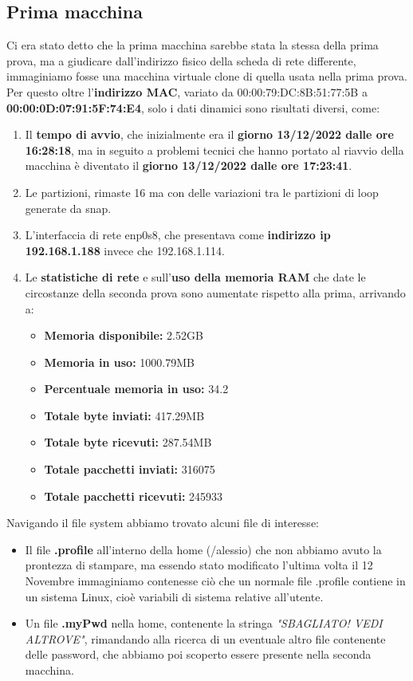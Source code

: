 \documentclass[a4paper]{report}
\begin{document}
\subsection{Prima macchina}
Ci era stato detto che la prima macchina sarebbe stata la stessa della prima prova, ma a giudicare dall'indirizzo fisico della scheda di rete differente, immaginiamo fosse una macchina virtuale clone di quella usata nella prima prova.
\\Per questo oltre l'\textbf{indirizzo MAC}, variato da 00:00:79:DC:8B:51:77:5B a\\ \textbf{00:00:0D:07:91:5F:74:E4}, solo i dati dinamici sono risultati diversi, come:
\begin{enumerate}
	\item Il \textbf{tempo di avvio}, che inizialmente era il \textbf{giorno 13/12/2022 dalle ore 16:28:18}, ma in seguito a problemi tecnici che hanno portato al riavvio della macchina è diventato il \textbf{giorno 13/12/2022 dalle ore 17:23:41}.
	\item Le partizioni, rimaste 16 ma con delle variazioni tra le partizioni di loop generate da snap.
	\item L'interfaccia di rete enp0s8, che presentava come \textbf{indirizzo ip 192.168.1.188} invece che 192.168.1.114.
	\item Le \textbf{statistiche di rete} e sull'\textbf{uso della memoria RAM} che date le circostanze della seconda prova sono aumentate rispetto alla prima, arrivando a:
	\begin{itemize}
		\item \textbf{Memoria disponibile:} 2.52GB
		\item \textbf{Memoria in uso:} 1000.79MB
		\item \textbf{Percentuale memoria in uso:} 34.2%
		\item \textbf{Totale byte inviati:} 417.29MB
		\item \textbf{Totale byte ricevuti:} 287.54MB
		\item \textbf{Totale pacchetti inviati:} 316075
		\item \textbf{Totale pacchetti ricevuti:} 245933
	\end{itemize}

\end{enumerate}
Navigando il file system abbiamo trovato alcuni file di interesse:
\begin{itemize}
	\item Il file \textbf{.profile} all'interno della home (/alessio) che non abbiamo avuto la prontezza di stampare, ma essendo stato modificato l'ultima volta il 12 Novembre immaginiamo contenesse ciò che un normale file .profile contiene in un sistema Linux, cioè variabili di sistema relative all'utente.
	\item Un file\textbf{ .myPwd} nella home, contenente la stringa \textit{\textit{"SBAGLIATO! VEDI ALTROVE"}}, rimandando alla ricerca di un eventuale altro file contenente delle password, che abbiamo poi scoperto essere presente nella seconda macchina.
\end{itemize}
\end{document}
